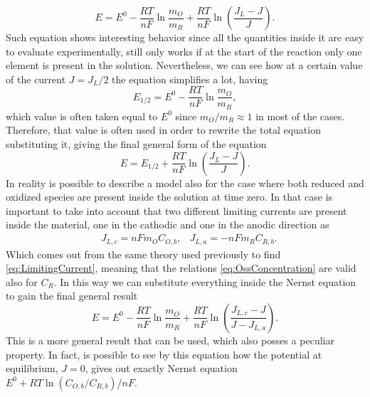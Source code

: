 \begin{equation}
    E = E^0 - \frac{RT}{nF}\ln\frac{m_O}{m_R} + \frac{RT}{nF}\ln\left( \frac{J_L - J}{J} \right).
\end{equation}
Such equation shows interesting behavior since all the quantities inside it are easy to evaluate experimentally, still only works if at the start of the reaction only one element is present in the solution. Nevertheless, we can see how at a certain value of the current $J = J_L/2$ the equation simplifies a lot, having
\begin{equation}
    E_{1/2} = E^0 - \frac{RT}{nF}\ln\frac{m_O}{m_R},
\end{equation}
which value is often taken equal to $E^0$ since $m_O/m_R \approx 1$ in most of the cases. Therefore, that value is often used in order to rewrite the total equation substituting it, giving the final general form of the equation
\begin{equation}
    E = E_{1/2} + \frac{RT}{nF}\ln\left( \frac{J_L - J}{J} \right).
\end{equation}
In reality is possible to describe a model also for the case where both reduced and oxidized species are present inside the solution at time zero. In that case is important to take into account that two different limiting currents are present inside the material, one in the cathodic and one in the anodic direction as
\begin{align}
    &J_{L,c} = nFm_OC_{O,b}, &J_{L,a} = -nFm_RC_{R,b}.
\end{align}
Which comes out from the same theory used previously to find \eqref{eq:LimitingCurrent}, meaning that the relations \eqref{eq:OssConcentration} are valid also for $C_R$. In this way we can substitute everything inside the Nernst equation to gain the final general result
\begin{equation}
    E = E^0 - \frac{RT}{nF}\ln\frac{m_O}{m_R} +\frac{RT}{nF}\ln\left( \frac{J_{L,c} - J}{J - J_{L,a}} \right).
\end{equation}
This is a more general result that can be used, which also posses a peculiar property. In fact, is possible to see by this equation how the potential at equilibrium, $J=0$, gives out exactly Nernst equation $E^0 + RT\ln(C_{O,b}/C_{R,b})/nF$.

